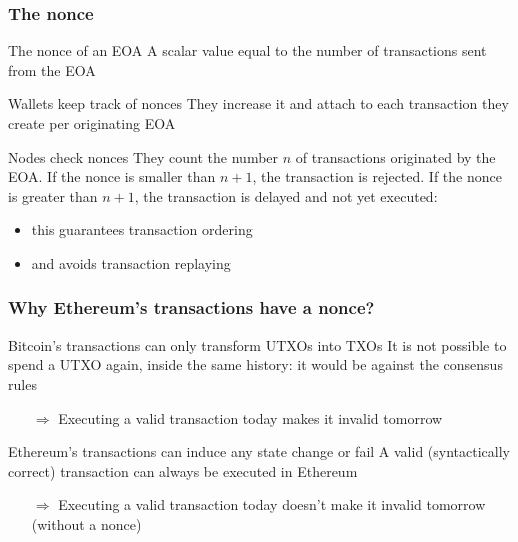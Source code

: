\documentclass[11pt]{beamer}  %
\begin{document}
\begin{frame}\frametitle{The nonce}

  \begin{greenbox}{The nonce of an EOA}
    A scalar value equal to the number of transactions sent from the EOA
  \end{greenbox}

  \bigskip

  \begin{greenbox}{Wallets keep track of nonces}
    They increase it and attach to each transaction they create per
    originating EOA
  \end{greenbox}

  \bigskip

  \begin{greenbox}{Nodes check nonces}
    They count the number $n$ of transactions originated
    by the EOA. If the nonce is smaller than $n+1$, the
    transaction is rejected. If the nonce is greater than $n+1$,
    the transaction is delayed and not yet executed:
    \begin{itemize}
    \item this guarantees transaction ordering
    \item and avoids transaction replaying
    \end{itemize}
  \end{greenbox}

\end{frame}

\begin{frame}\frametitle{Why Ethereum's transactions have a nonce?}

  \begin{greenbox}{Bitcoin's transactions can only transform UTXOs into TXOs}
    It is not possible to spend a UTXO again, inside the same history:
    it would be against the consensus rules
    \begin{itemize}
    \item[$\Rightarrow$] Executing a valid transaction today makes it invalid tomorrow
    \end{itemize}
  \end{greenbox}

  \bigskip
  \bigskip

  \begin{greenbox}{Ethereum's transactions can induce any state change or fail}
    A valid (syntactically correct) transaction can always be executed in Ethereum
    \begin{itemize}
    \item[$\Rightarrow$] Executing a valid transaction today doesn't make it invalid tomorrow
      \alert{(without a nonce)}
    \end{itemize}
  \end{greenbox}

\end{frame}
\end{document}
